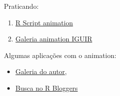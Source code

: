 \begin{frame}
  Praticando:
  \begin{enumerate}
  \item
    \href{run:./R/animation/animation.R}{R Script animation}
  \item 
	\href{run:./animation/animation.html}{Galeria animation IGUIR}
  \end{enumerate}
  
  \vspace{0.5cm}
  Algumas aplicações com o animation:
  \begin{itemize}
  \item \href{http://vis.supstat.com/categories.html\#animation-ref}{Galeria
      do autor},
  \item \href{http://www.r-bloggers.com/?s=animation}{Busca no R
      Bloggers}
  \end{itemize}

\end{frame}

